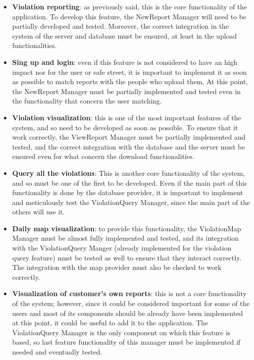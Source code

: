 \documentclass[../RASD.tex]{subfiles}
\begin{document}
    \begin{itemize}
        \item \textbf{Violation reporting}: as previously said, this is the core functionality of the application.
        To develop this feature, the NewReport Manager will need to be partially developed and tested.
        Moreover, the correct integration in the system of the server and database must be ensured, at least in the upload functionalities.

        \item \textbf{Sing up and login}: even if this feature is not considered to have an high impact nor for the user or safe street,
        it is important to implement it as soon as possible to match reports with the people who upload them.
        At this point, the NewReport Manager must be partially implemented and tested even in the functionality that concern the user matching.

        \item \textbf{Violation visualization}: this is one of the most important features of the system, and so need to be developed as soon as possible.
        To ensure that it work correctly, the ViewReport Manager must be partially implemented and tested,
        and the correct integration with the database and the server must be ensured even for what concern the download functionalities.

        \item \textbf{Query all the violations}: This is another core functionality of the system, and so must be one of the first to be developed.
        Even if the main part of this functionality is done by the database provider, it is important to implement and meticulously test the ViolationQuery Manager,
        since the main part of the others will use it.

        \item \textbf{Daily map visualization}: to provide this functionality, the ViolationMap Manager must be almost fully implemented and tested,
        and its integration with the ViolationQuery Manger (already implemented for the violation query feature) must be tested as well to ensure
        that they interact correctly.
        The integration with the map provider must also be checked to work correctly.

        \item \textbf{Visualization of customer’s own reports}: this is not a core functionality of the system;
        however, since it could be considered important for some of the users and most of its components should be already have been implemented at this point,
        it could be useful to add it to the application.
        The ViolationQuery Manager is the only component on which this feature is based, so last feature functionality of this manager
        must be implemented if needed and eventually tested.


\end{itemize}
\end{document}
